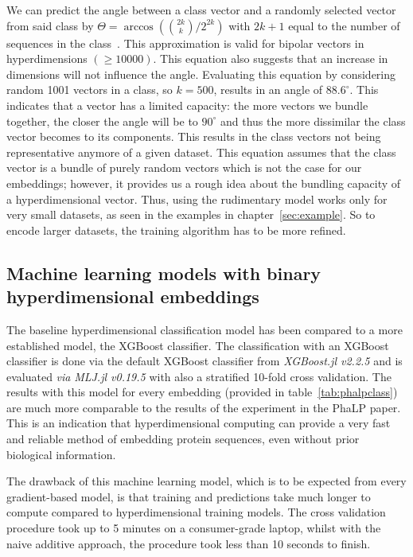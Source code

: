 We can predict the angle between a class vector and a randomly selected vector from said class by $\Theta = \arccos({2k \choose k}/2^{2k})$ with $2k+1$ equal to the number of sequences in the class~\cite{sathdv}. This approximation is valid for bipolar vectors in hyperdimensions $(\ge 10000)$. This equation also suggests that an increase in dimensions will not influence the angle. Evaluating this equation by considering random 1001 vectors in a class, so $k = 500$, results in an angle of $88.6^{\circ}$. This indicates that a vector has a limited capacity: the more vectors we bundle together, the closer the angle will be to $90^{\circ}$ and thus the more dissimilar the class vector becomes to its components. This results in the class vectors not being representative anymore of a given dataset. This equation assumes that the class vector is a bundle of purely random vectors which is not the case for our embeddings; however, it provides us a rough idea about the bundling capacity of a hyperdimensional vector. Thus, using the rudimentary model works only for very small datasets, as seen in the examples in chapter~\ref{sec:example}. So to encode larger datasets, the training algorithm has to be more refined.

\subsection*{Machine learning models with binary hyperdimensional embeddings}
The baseline hyperdimensional classification model has been compared to a more established model, the XGBoost classifier. The classification with an XGBoost classifier is done via the default XGBoost classifier from \textit{XGBoost.jl v2.2.5} and is evaluated \textit{via} \textit{MLJ.jl v0.19.5} with also a stratified 10-fold cross validation. The results with this model for every embedding (provided in table~\ref{tab:phalpclass}) are much more comparable to the results of the experiment in the PhaLP paper. This is an indication that hyperdimensional computing can provide a very fast and reliable method of embedding protein sequences, even without prior biological information. 

The drawback of this machine learning model, which is to be expected from every gradient-based model, is that training and predictions take much longer to compute compared to hyperdimensional training models. The cross validation procedure took up to 5 minutes on a consumer-grade laptop, whilst with the naive additive approach, the procedure took less than 10 seconds to finish.

